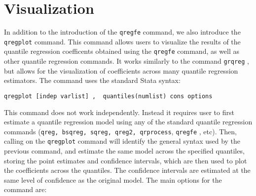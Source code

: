 \documentclass[bib]{statapress}
\begin{document}
\section{Visualization}\label{visualization}

In addition to the introduction of the \texttt{qregfe} command, we also
introduce the \texttt{qregplot} command. This command allows users to
visualize the results of the quantile regression coefficents obtained
using the \texttt{qregfe} command, as well as other quantile regression
commands. It works similarly to the command \texttt{grqreg}
\citep{grqreg}, but allows for the visualization of coefficients across
many quantile regression estimators. The command uses the standard Stata
syntax:

\texttt{qregplot\ {[}indep\ varlist{]}\ ,\ \ quantiles(numlist)\ cons\ options}

This command does not work independently. Instead it requires user to
first estimate a quantile regression model using any of the standard
quantile regression commands
(\texttt{qreg,\ bsqreg,\ sqreg,\ qreg2,\ qrprocess}, \texttt{qregfe} ,
etc). Then, calling on the \texttt{qregplot} command will identify the
general syntax used by the previous command, and estimate the same model
across the specified quantiles, storing the point estimates and
confidence intervals, which are then used to plot the coefficients
across the quantiles. The confidence intervals are estimated at the same
level of confidence as the original model. The main options for the
command are:
\end{document}
